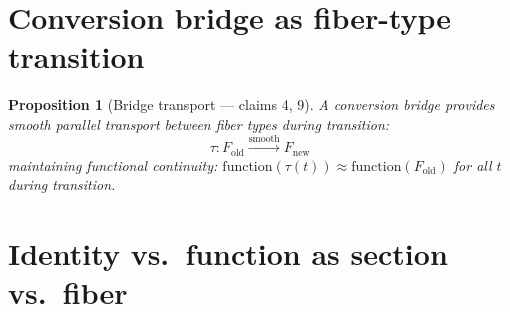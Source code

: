\documentclass[11pt,a4paper]{article}
\newtheorem{proposition}[definition]{Proposition}
\begin{document}
\section{Conversion bridge as fiber-type transition}

\begin{proposition}[Bridge transport --- claims 4, 9]
\label{prop:bridge}
A \emph{conversion bridge} provides smooth parallel transport between
fiber types during transition:
\[
  \tau: F_{\text{old}} \xrightarrow{\text{smooth}} F_{\text{new}}
\]
maintaining functional continuity: $\text{function}(\tau(t)) \approx
\text{function}(F_{\text{old}})$ for all $t$ during transition.
\end{proposition}


\section{Identity vs.\ function as section vs.\ fiber}
\label{sec:identity}
\end{document}

